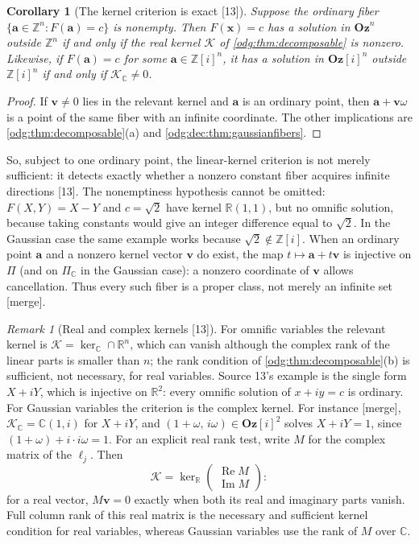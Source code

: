 \documentclass[11pt,oneside]{article}
\numberwithin{equation}{section}
\newtheorem{corollary}[corollary]{Corollary}
\theoremstyle{definition}
\theoremstyle{remark}
\newtheorem{remark}[remark]{Remark}
\newcommand{\Oz}{\mathbf{Oz}}
\newcommand{\Z}{\mathbb Z}
\newcommand{\R}{\mathbb R}
\newcommand{\C}{\mathbb C}
\newcommand{\src}[1]{\textup{\textsf{\small[#1]}}}
\newcommand{\mergetag}{\textup{\textsf{\small[merge]}}}
\newcommand{\Og}{\Oz[i]}
\begin{document}
\begin{corollary}[The kernel criterion is exact \src{13}]\label{odg:dec:cor:converse}
Suppose the ordinary fiber $\{\mathbf a\in\Z^n:F(\mathbf a)=c\}$ is nonempty.
Then $F(\mathbf x)=c$ has a solution in $\Oz^n$ outside $\Z^n$ if and only if
the real kernel $\mathcal K$ of \cref{odg:thm:decomposable} is nonzero.
Likewise, if $F(\mathbf a)=c$ for some $\mathbf a\in\Z[i]^n$, it has a
solution in $\Og^n$ outside $\Z[i]^n$ if and only if $\mathcal K_{\C}\ne0$.
\end{corollary}
\begin{proof}
If $\mathbf v\ne0$ lies in the relevant kernel and $\mathbf a$ is an ordinary
point, then $\mathbf a+\mathbf v\omega$ is a point of the same fiber with an
infinite coordinate. The other implications are
\cref{odg:thm:decomposable}(a) and \cref{odg:dec:thm:gaussianfibers}.
\end{proof}

So, subject to one ordinary point, the linear-kernel criterion is not merely
sufficient: it detects exactly whether a nonzero constant fiber acquires
infinite directions \src{13}.
The nonemptiness hypothesis cannot be omitted: $F(X,Y)=X-Y$ and
$c=\sqrt2$ have kernel $\R(1,1)$, but no omnific solution, because
taking constants would give an integer difference equal to $\sqrt2$.
In the Gaussian case the same example works because $\sqrt2\notin\Z[i]$.
When an ordinary point $\mathbf a$ and a nonzero kernel vector
$\mathbf v$ do exist, the map $t\mapsto\mathbf a+t\mathbf v$ is
injective on $\Pi$ (and on $\Pi_{\C}$ in the Gaussian case): a nonzero
coordinate of $\mathbf v$ allows cancellation. Thus every such fiber
is a proper class, not merely an infinite set \mergetag.

\begin{remark}[Real and complex kernels \src{13}]\label{odg:dec:rem:kernels}
For omnific variables the relevant kernel is
$\mathcal K=\ker_{\C}\cap\R^n$, which can vanish although the complex rank of
the linear parts is smaller than $n$; the rank condition of
\cref{odg:thm:decomposable}(b) is sufficient, not necessary, for real
variables. Source 13's example is the single form $X+iY$, which is injective
on $\R^2$: every omnific solution of $x+iy=c$ is ordinary. For Gaussian
variables the criterion is the complex kernel. For instance \mergetag,
$\mathcal K_{\C}=\C(1,i)$ for $X+iY$, and $(1+\omega,\,i\omega)\in\Og^2$
solves $X+iY=1$, since $(1+\omega)+i\cdot i\omega=1$.
For an explicit real rank test, write $M$ for the complex matrix of the
$\ell_j$. Then
\[
 \mathcal K=\ker_{\R}
 \begin{pmatrix}\operatorname{Re}M\\ \operatorname{Im}M\end{pmatrix}:
\]
for a real vector, $M\mathbf v=0$ exactly when both its real and
imaginary parts vanish. Full column rank of this real matrix is the
necessary and sufficient kernel condition for real variables, whereas
Gaussian variables use the rank of $M$ over $\C$.
\end{remark}
\end{document}
